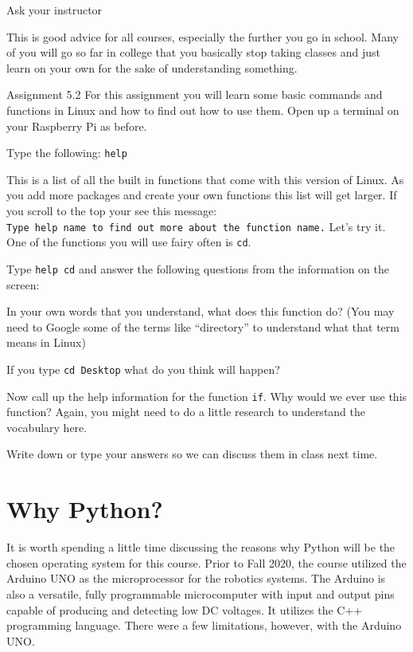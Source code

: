 \documentclass[
]{book}
\begin{document}
Ask your instructor

This is good advice for all courses, especially the further you go in school. Many of you will go so far in college that you basically stop taking classes and just learn on your own for the sake of understanding something.

Assignment 5.2
For this assignment you will learn some basic commands and functions in Linux and how to find out how to use them.
Open up a terminal on your Raspberry Pi as before.

Type the following:
\texttt{help}

This is a list of all the built in functions that come with this version of Linux. As you add more packages and create your own functions this list will get larger. If you scroll to the top your see this message:
\texttt{Type\ \textquotesingle{}help\ name\textquotesingle{}\ to\ find\ out\ more\ about\ the\ function\ \textquotesingle{}name\textquotesingle{}.}
Let's try it. One of the functions you will use fairy often is \texttt{cd}.

Type \texttt{help\ cd} and answer the following questions from the information on the screen:

In your own words that you understand, what does this function do? (You may need to Google some of the terms like ``directory'' to understand what that term means in Linux)

If you type \texttt{cd\ Desktop} what do you think will happen?

Now call up the help information for the function \texttt{if}.
Why would we ever use this function? Again, you might need to do a little research to understand the vocabulary here.

Write down or type your answers so we can discuss them in class next time.

\hypertarget{why-python}{%
\section{Why Python?}\label{why-python}}

It is worth spending a little time discussing the reasons why Python will be the chosen operating system for this course. Prior to Fall 2020, the course utilized the Arduino UNO as the microprocessor for the robotics systems. The Arduino is also a versatile, fully programmable microcomputer with input and output pins capable of producing and detecting low DC voltages. It utilizes the C++ programming language. There were a few limitations, however, with the Arduino UNO.
\end{document}
